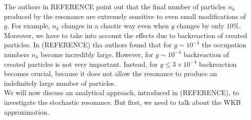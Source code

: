 \documentclass[11pt,a4paper,twoside]{book}
\begin{document}
The authors in REFERENCE point out that the final number of particles $ n_{k} $ produced by the resonance are extremely sensitive to even small modifications of $ g $. For example, $ n_{k} $ changes in a chaotic way even when $ g $ changes by only $ 10\% $. Moreover, we have to take into account the effects due to backreaction of created particles. In (REFERENCE) tha authors found that for $ g \sim 10^{-3} $ the occupation numbers $ n_{k} $ become incredibly large. However, for $ g \sim 10^{-4} $ backreaction of created particles is not very important. Instead, for $ g \le 3 \times 10^{-4} $ backreaction becomes crucial, because it does not allow the resonance to produce an indefinitely large number of particles.\\
We will now discuss an analytical approach, introduced in (REFERENCE), to investigate the stochastic resonance. But first, we need to talk about the WKB approximation.
\end{document}
